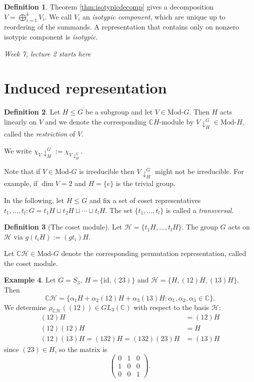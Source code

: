 \documentclass{article}
\newcommand{\cH}{\mathcal{H}}
\newcommand{\C}{\mathbb{C}}
\newcommand{\id}{\text{id}}
\newcommand{\Mod}{\text{Mod-}}
\theoremstyle{definition}
\newtheorem{defn}{Definition}[subsection]
\newtheorem{example}[defn]{Example}
\begin{document}
\begin{defn}
Theorem \ref{thm:isotypicdecomp} gives a decomposition $V=\bigoplus_{i=1}^k V_i$. We call $V_i$ an \textit{isotypic component}, which are unique up to reordering of the summands. A representation that contains only on nonzero isotypic component is \textit{isotypic}.
\end{defn}

\begin{flushright}
\textit{Week 7, lecture 2 starts here}
\end{flushright}

\section{Induced representation}
\begin{defn}
Let $H\leq G$ be a subgroup and let $V\in\Mod G$. Then $H$ acts linearly on $V$ and we denote the corresponding $\C H$-module by $V\downarrow_H^G\in\Mod H$, called the \textit{restriction} of $V$.

We write $\chi_V\downarrow_H^G:=\chi_{V\downarrow_H^G}$.
\end{defn}
Note that if $V\in\Mod G$ is irreducible then $V\downarrow_H^G$ might not be irreducible. For example, if $\dim V=2$ and $H=\{e\}$ is the trivial group.

In the following, let $H\leq G$ and fix a set of coset representatives $t_1,\ldots,t_l:G=t_1H\sqcup t_2H\sqcup\cdots\sqcup t_lH$. The set $\{t_1,\ldots,t_l\}$ is called a \textit{transversal}.

\begin{defn}[The coset module]
Let $\cH=\{t_1H,\ldots,t_l H\}$. The group $G$ acts on $\cH$ via $g(t_i H):=(gt_i)H$.

Let $\C\cH\in\Mod G$ denote the corresponding permutation representation, called the coset module.
\end{defn}

\begin{example}
Let $G=S_3,\ H=\{\id,(23)\}$ and $\cH=\{H,(12)H,(13)H\}$. Then
\[
\C\cH=\{\alpha_1 H+\alpha_2(12)H+\alpha_3(13)H:\alpha_1,\alpha_2,\alpha_3\in\C\}.
\]
We determine $\rho_{\C\cH}((12))\in GL_3(\C)$ with respect to the basis $\cH$:
\[
\begin{aligned}
(12)H&=(12)H\\
(12)(12)H&=H\\
(12)(13)H=(132)H=(132)(23)H&=(13)H
\end{aligned}
\]
since $(23)\in H$, so the matrix is
\[
\begin{pmatrix}
0&1&0\\1&0&0\\0&0&1
\end{pmatrix}.
\]
\end{example}
\end{document}
